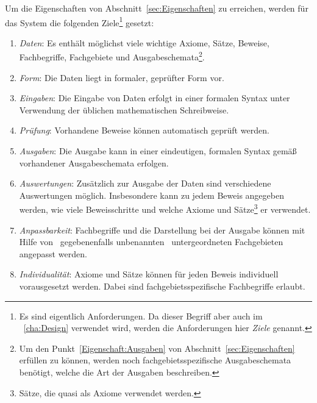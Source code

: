 \documentclass[english,ngerman,parskip=half,headsepline,footsepline]{scrreprt}
\newcommand*{\sectionname}{Abschnitt}
\begin{document}
{		Um die Eigenschaften von \sectionname~\vref{sec:Eigenschaften} zu erreichen, werden für das System die folgenden Ziele\footnote{ Es sind eigentlich Anforderungen. Da dieser Begriff aber auch im \chaptername~\vref{cha:Design} verwendet wird, werden die Anforderungen hier \emph{Ziele} genannt.} gesetzt:

		\begin{enumerate}

			\item \label{Ziel:Daten} \emph{Daten}: Es enthält möglichst viele wichtige Axiome, Sätze, Beweise, Fachbegriffe, Fachgebiete und Ausgabeschemata\footnote{Um den Punkt~\ref{Eigenschaft:Ausgaben} von \sectionname~\vref{sec:Eigenschaften} erfüllen zu können, werden noch fachgebietsspezifische Ausgabeschemata benötigt, welche die Art der Ausgaben beschreiben.}.

			\item \label{Ziel:Form} \emph{Form}: Die Daten liegt in formaler, geprüfter Form vor.

			\item \label{Ziel:Eingaben} \emph{Eingaben}: Die Eingabe von Daten erfolgt in einer formalen Syntax unter Verwendung der üblichen mathematischen Schreibweise.

			\item \label{Ziel:Prüfung} \emph{Prüfung}: Vorhandene Beweise können automatisch geprüft werden.

			\item \label{Ziel:Ausgaben} \emph{Ausgaben}: Die Ausgabe kann in einer eindeutigen, formalen Syntax gemäß vorhandener Ausgabeschemata erfolgen.

			\item \label{Ziel:Auswertungen} \emph{Auswertungen}: Zusätzlich zur Ausgabe der Daten sind verschiedene Auswertungen möglich. Insbesondere kann zu jedem Beweis angegeben werden, wie viele Beweisschritte und welche Axiome und Sätze\footnote{Sätze, die quasi als Axiome verwendet werden.} er verwendet.

			\item \label{Ziel:Anpassbarkeit} \emph{Anpassbarkeit}: Fachbegriffe und die Darstellung bei der Ausgabe können mit Hilfe von \textendash\ gegebenenfalls unbenannten \textendash\ untergeordneten Fachgebieten angepasst werden.

			\item \label{Ziel:Individualität} \emph{Individualität}: Axiome und Sätze können für jeden Beweis individuell vorausgesetzt werden. Dabei sind fachgebietsspezifische Fachbegriffe erlaubt.


\end{enumerate}}
\end{document}
